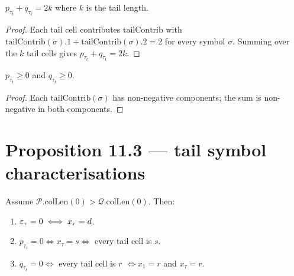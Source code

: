 \begin{lemma}
  \label{lem:tailSig_sum}
  \leanok
  $p_{\tau_t} + q_{\tau_t} = 2k$ where $k$ is the tail length.
\end{lemma}
\begin{proof}
  \leanok
  Each tail cell contributes $\mathrm{tailContrib}$ with $\mathrm{tailContrib}(\sigma).1 + \mathrm{tailContrib}(\sigma).2 = 2$ for every symbol $\sigma$. Summing over the $k$ tail cells gives $p_{\tau_t} + q_{\tau_t} = 2k$.
\end{proof}


\begin{lemma}
  \label{lem:tailSig_nonneg}
  \leanok
  $p_{\tau_t} \geq 0$ and $q_{\tau_t} \geq 0$.
\end{lemma}
\begin{proof}
  \leanok
  Each $\mathrm{tailContrib}(\sigma)$ has non-negative components; the sum is non-negative in both components.
\end{proof}


\section{Proposition 11.3 — tail symbol characterisations}

\begin{lemma}
  \label{lem:11_3}
  \leanok
  Assume $\mathcal{P}.\mathrm{colLen}(0) > \mathcal{Q}.\mathrm{colLen}(0)$. Then:
  \begin{enumerate}
    \item $\varepsilon_\tau = 0 \iff x_\tau = d$.
    \item $p_{\tau_t} = 0 \iff x_\tau = s \iff $ every tail cell is $s$.
    \item $q_{\tau_t} = 0 \iff $ every tail cell is $r$ $\iff x_1 = r$ and $x_\tau = r$.
  \end{enumerate}
\end{lemma}

